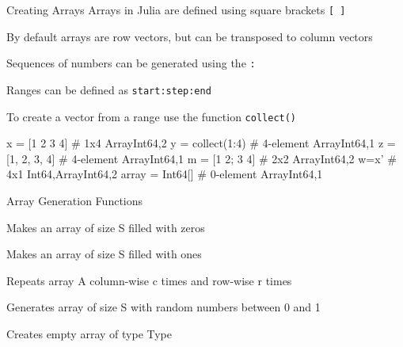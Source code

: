 \documentclass{beamer}
\newenvironment{Boxx}{\begin{tcolorbox}[standard jigsaw, opacityframe=0.8, opacityback=0.0,left=2pt,right=2pt,top=0pt,bottom=0pt]}{\end{tcolorbox}}
\begin{document}
\begin{frame}[fragile]{Creating Arrays}
	Arrays in Julia are defined using square brackets {\color{red}\verb|[ ]|}
	
	By default arrays are row vectors, but can be transposed to column vectors
\pause

	Sequences of numbers can be generated using the {\color{red}\verb|:|}
	 
	Ranges can be defined as {\color{red} \verb|start:step:end|}
	
	To create a vector from a range use the function {\color{red}\verb|collect()|}

\pause
  \begin{Boxx}
  \begin{jllisting}
  	x = [1 2 3 4] 			# 1x4 Array{Int64,2}
	y = collect(1:4) 		# 4-element Array{Int64,1}
	z = [1, 2, 3, 4] 		# 4-element Array{Int64,1}
	m = [1 2; 3 4]			# 2x2 Array{Int64,2}
	w=x'						# 4x1 {Int64,Array{Int64,2}}
	array = Int64[]		# 0-element Array{Int64,1}
	\end{jllisting}
  \end{Boxx}
	

	\pause
	\vspace*{-0.15cm}

	\pause
	\vspace*{0.15cm}

	
\end{frame}

\begin{frame}[fragile]{Array Generation Functions}
	\begin{description}[leftmargin=*]
		\item[zeros(S)] Makes an array of size S filled with zeros  
		\item[ones(S)]  Makes an array of size S filled with ones 
		\item[repeat(A,c,r)] Repeats array A column-wise c times and row-wise r times
		\item[rand(S)] Generates array of size S with random numbers between 0 and 1
		\item[Type\textbf{[]}] Creates empty array of type Type
	\end{description}
	
\end{frame}
\end{document}
